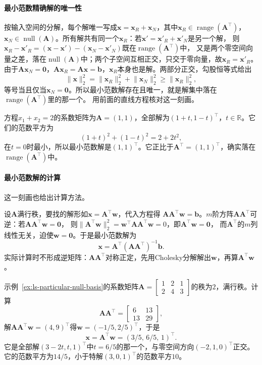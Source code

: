 \paragraph{最小范数精确解的唯一性}

按输入空间的分解，每个解唯一写成$\bm x=\bm x_R+\bm x_N$，其中$\bm x_R\in\operatorname{range}(\bm A^\top)$，
$\bm x_N\in\operatorname{null}(\bm A)$。所有解共有同一个$\bm x_R$：若$\bm x'=\bm x'_R+\bm x'_N$是另一个解，
则$\bm x_R-\bm x'_R=(\bm x-\bm x')-(\bm x_N-\bm x'_N)$既在$\operatorname{range}(\bm A^\top)$中，
又是两个零空间向量之差，落在$\operatorname{null}(\bm A)$中；两个子空间互相正交，只交于零向量，故$\bm x_R=\bm x'_R$。
由于$\bm A\bm x_N=\bm0$，$\bm A\bm x_R=\bm A\bm x=\bm b$，$\bm x_R$本身也是解。两部分正交，勾股恒等式给出
\[
 \lVert\bm x\rVert_2^2=\lVert\bm x_R\rVert_2^2+\lVert\bm x_N\rVert_2^2\geq\lVert\bm x_R\rVert_2^2,
\]
等号当且仅当$\bm x_N=\bm0$。所以最小范数解存在且唯一，就是解集中落在$\operatorname{range}(\bm A^\top)$里的那一个。
用前面的直线方程核对这一刻画。

\begin{example}[直线$x_1+x_2=2$上的最小范数解]
\label{ex:ls-min-norm-line}
方程$x_1+x_2=2$的系数矩阵为$\bm A=(1,1)$，全部解为$(1+t,1-t)^\top$，$t\in\mathbb R$。它们的范数平方为
\[
 (1+t)^2+(1-t)^2=2+2t^2,
\]
在$t=0$时最小，所以最小范数解是$(1,1)^\top$。它正比于$\bm A^\top=(1,1)^\top$，确实落在$\operatorname{range}(\bm A^\top)$中。
\end{example}

\paragraph{最小范数解的计算}

这一刻画也给出计算方法。

设$\bm A$满行秩，要找的解形如$\bm x=\bm A^\top\bm w$，代入方程得
$\bm A\bm A^\top\bm w=\bm b$。$m$阶方阵$\bm A\bm A^\top$可逆：若$\bm A\bm A^\top\bm w=\bm0$，
则$\lVert\bm A^\top\bm w\rVert_2^2=\bm w^\top\bm A\bm A^\top\bm w=0$，即$\bm A^\top\bm w=\bm0$，
而$\bm A^\top$的$m$列线性无关，迫使$\bm w=\bm0$。于是最小范数解为
\[
 \bm x=\bm A^\top(\bm A\bm A^\top)^{-1}\bm b .
\]
实际计算时不形成逆矩阵：$\bm A\bm A^\top$对称正定，先用Cholesky分解解出$\bm w$，再算$\bm A^\top\bm w$。

\begin{example}[满行秩方程的最小范数解]
\label{ex:ls-min-norm-row-full-rank}
示例~\ref{ex:ls-particular-null-basis}的系数矩阵$\bm A=\left[\begin{smallmatrix}1&2&1\\2&4&3\end{smallmatrix}\right]$的秩为$2$，满行秩。计算
\[
 \bm A\bm A^\top=\begin{bmatrix}6&13\\13&29\end{bmatrix},
\]
解$\bm A\bm A^\top\bm w=(4,9)^\top$得$\bm w=(-1/5,2/5)^\top$，于是
\[
 \bm x=\bm A^\top\bm w=(3/5,\,6/5,\,1)^\top .
\]
它是全部解$(3-2t,t,1)^\top$中$t=6/5$的那一个，与零空间方向$(-2,1,0)^\top$正交。
它的范数平方为$14/5$，小于特解$(3,0,1)^\top$的范数平方$10$。
\end{example}

